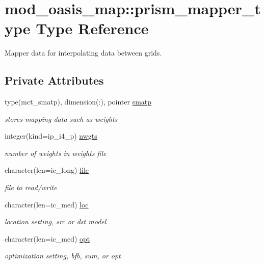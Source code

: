 \hypertarget{structmod__oasis__map_1_1prism__mapper__type}{}\section{mod\+\_\+oasis\+\_\+map\+:\+:prism\+\_\+mapper\+\_\+type Type Reference}
\label{structmod__oasis__map_1_1prism__mapper__type}


Mapper data for interpolating data between grids.  


\subsection*{Private Attributes}
\begin{DoxyCompactItemize}
\item 
type(mct\+\_\+smatp), dimension(\+:), pointer \hyperlink{structmod__oasis__map_1_1prism__mapper__type_a46e59a2d0c41fc11532e14ef413522f1}{smatp}
\begin{DoxyCompactList}\small\item\em stores mapping data such as weights \end{DoxyCompactList}\item 
integer(kind=ip\+\_\+i4\+\_\+p) \hyperlink{structmod__oasis__map_1_1prism__mapper__type_a90bcd6831549c027de72dbba1daa0939}{nwgts}
\begin{DoxyCompactList}\small\item\em number of weights in weights file \end{DoxyCompactList}\item 
character(len=ic\+\_\+long) \hyperlink{structmod__oasis__map_1_1prism__mapper__type_a10ad0d8412afdfa993728ac63e117e9e}{file}
\begin{DoxyCompactList}\small\item\em file to read/write \end{DoxyCompactList}\item 
character(len=ic\+\_\+med) \hyperlink{structmod__oasis__map_1_1prism__mapper__type_a37a969cc8b9d9234e6e99c6d3ef144ad}{loc}
\begin{DoxyCompactList}\small\item\em location setting, src or dst model \end{DoxyCompactList}\item 
character(len=ic\+\_\+med) \hyperlink{structmod__oasis__map_1_1prism__mapper__type_a3b10832f360b8f2061807dfdec6be493}{opt}
\begin{DoxyCompactList}\small\item\em optimization setting, bfb, sum, or opt \end{DoxyCompactList}\item 

\end{DoxyCompactItemize}
